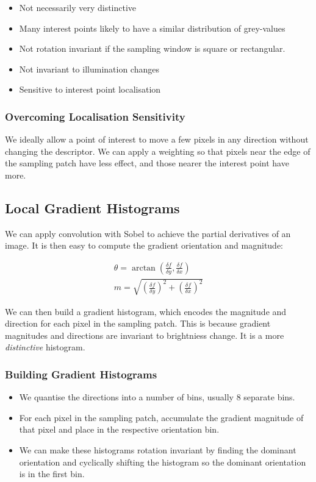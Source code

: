 \begin{itemize}
    \itemsep0em
    \item Not necessarily very distinctive
    \item Many interest points likely to have a similar distribution of grey-values
    \item Not rotation invariant if the sampling window is square or rectangular.
    \item Not invariant to illumination changes
    \item Sensitive to interest point localisation
\end{itemize}

\subsubsection{Overcoming Localisation Sensitivity}

We ideally allow a point of interest to move a few pixels in any direction without changing the descriptor. We can apply a weighting so that pixels near the edge of the sampling patch have less effect, and those nearer the interest point have more.

\subsection{Local Gradient Histograms}

We can apply convolution with Sobel to achieve the partial derivatives of an image. It is then easy to compute the gradient orientation and magnitude:

\begin{align}
    \theta = \arctan \left(\frac{\delta f}{\delta y}, \frac{\delta f}{\delta x} \right) \\
    m = \sqrt{(\frac{\delta f}{\delta y})^2 + (\frac{\delta f}{\delta x})^2}
\end{align}

\noindent We can then build a gradient histogram, which encodes the magnitude and direction for each pixel in the sampling patch. This is because gradient magnitudes and directions are invariant to brightniess change. It is a more \textit{distinctive} histogram.

\subsubsection{Building Gradient Histograms}

\begin{itemize}
    \itemsep0em
    \item We quantise the directions into a number of bins, usually 8 separate bins.
    \item For each pixel in the sampling patch, accumulate the gradient magnitude of that pixel and place in the respective orientation bin.
    \item We can make these histograms rotation invariant by finding the dominant orientation and cyclically shifting the histogram so the dominant orientation is in the first bin.
\end{itemize}

